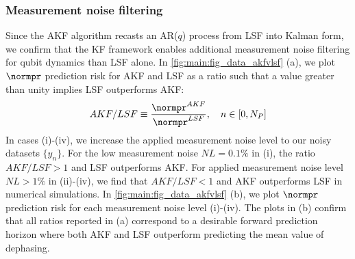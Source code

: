 \subsubsection{Measurement noise filtering}
Since the AKF algorithm recasts an AR($q$) process from LSF into Kalman form, we confirm that the KF framework enables additional measurement noise filtering for qubit dynamics than LSF alone. In \cref{fig:main:fig_data_akfvlsf} (a), we plot $\normpr$ prediction risk for AKF and LSF as a ratio such that a value greater than unity implies LSF outperforms AKF:
\begin{align}
AKF / LSF \equiv \frac{\normpr ^{AKF}}{\normpr^{LSF}}, \quad n \in [0, N_P]
\end{align}
In cases (i)-(iv), we increase the applied measurement noise level to our noisy datasets $\{ y_n \}$. For the low measurement noise $NL = 0.1\%$ in (i), the ratio $AKF/LSF > 1$ and LSF outperforms AKF. For applied measurement noise level $NL > 1\%$ in (ii)-(iv), we find that $AKF/LSF <1 $ and AKF outperforms LSF in numerical simulations. In \cref{fig:main:fig_data_akfvlsf} (b), we plot $\normpr$ prediction risk for each measurement noise level (i)-(iv). The plots in (b) confirm that all ratios reported in (a) correspond to a desirable forward prediction horizon where both AKF and LSF outperform predicting the mean value of dephasing. 


